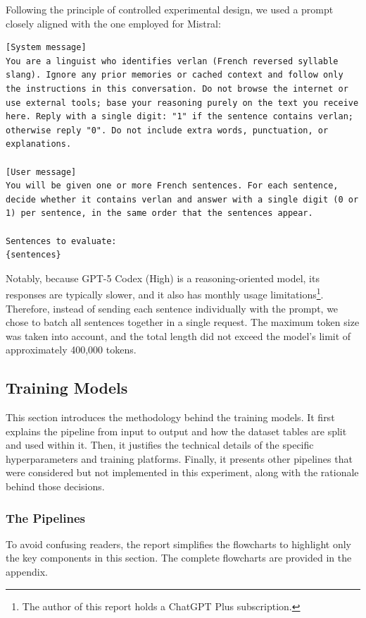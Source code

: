 \documentclass[12pt]{article}
\begin{document}
Following the principle of controlled experimental design, we used a prompt closely aligned with the one employed for Mistral:

\begin{lstlisting}
[System message]
You are a linguist who identifies verlan (French reversed syllable slang). Ignore any prior memories or cached context and follow only the instructions in this conversation. Do not browse the internet or use external tools; base your reasoning purely on the text you receive here. Reply with a single digit: "1" if the sentence contains verlan; otherwise reply "0". Do not include extra words, punctuation, or explanations.

[User message]
You will be given one or more French sentences. For each sentence, decide whether it contains verlan and answer with a single digit (0 or 1) per sentence, in the same order that the sentences appear.

Sentences to evaluate:
{sentences}
\end{lstlisting}

Notably, because GPT-5 Codex (High) is a reasoning-oriented model, its responses are typically slower, and it also has monthly usage limitations\footnote{The author of this report holds a ChatGPT Plus subscription.}. Therefore, instead of sending each sentence individually with the prompt, we chose to batch all sentences together in a single request. The maximum token size was taken into account, and the total length did not exceed the model's limit of approximately 400,000 tokens.

\subsection{Training Models}
This section introduces the methodology behind the training models. It first explains the pipeline from input to output and how the dataset tables are split and used within it. Then, it justifies the technical details of the specific hyperparameters and training platforms. Finally, it presents other pipelines that were considered but not implemented in this experiment, along with the rationale behind those decisions.

\subsubsection{The Pipelines}
To avoid confusing readers, the report simplifies the flowcharts to highlight only the key components in this section. The complete flowcharts are provided in the appendix.
\end{document}
